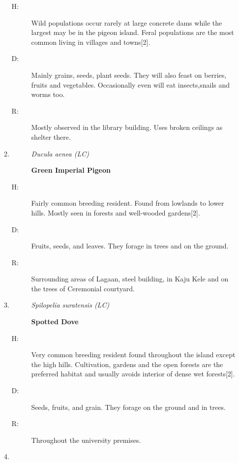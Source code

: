 \begin{itemize}
\begin{enumerate}
\begin{description}
\end{description}%
\begin{description}%
\item[H: ]%
Wild populations occur rarely at large concrete dams while the largest may be in the pigeon island. Feral populations are the most common living in villages and towns{[}2{]}.%
\item[D: ]%
Mainly grains, seeds, plant seeds. They will also feast on berries, fruits and vegetables. Occasionally even will eat insects,snails and worms too.%
\item[R: ]%
Mostly observed in the library building. Uses broken ceilings as shelter there.%
\end{description}%
\item%
\begin{description}%
\item[]%
\textit{Ducula aenea (LC)}%
\item[]%
\textbf{Green Imperial Pigeon}%
\end{description}%
\begin{description}%
\item[H: ]%
Fairly common breeding resident. Found from lowlands to lower hills. Mostly seen in forests and well{-}wooded gardens{[}2{]}.%
\item[D: ]%
Fruits, seeds, and leaves. They forage in trees and on the ground.%
\item[R: ]%
Surrounding areas of Lagaan, steel building, in Kaju Kele and on the trees of Ceremonial courtyard.%
\end{description}%
\item%
\begin{description}%
\item[]%
\textit{Spilopelia suratensis (LC)}%
\item[]%
\textbf{Spotted Dove}%
\end{description}%
\begin{description}%
\item[H: ]%
Very common breeding resident found throughout the island except the high hills. Cultivation, gardens and the open forests are the preferred habitat and usually avoids interior of dense wet forests{[}2{]}.%
\item[D: ]%
Seeds, fruits, and grain. They forage on the ground and in trees.%
\item[R: ]%
Throughout the university premises.%
\end{description}%
\item%
\begin{description}%

\end{description}
\end{enumerate}
\end{itemize}
